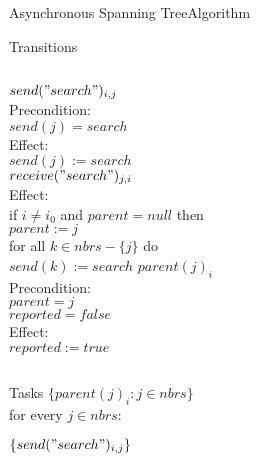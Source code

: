 \documentclass[pdf]{beamer}
\begin{document}
\begin{frame}{Asynchronous Spanning Tree}{Algorithm}
    \begin{block}{Transitions}
        \begin{columns}[t]
            $send("search")_{i,j}$ \\
            \hspace*{2pt} {Precondition:} \\
            \hspace*{5pt} {$send(j) = search$} \\
            \hspace*{2pt} {Effect:} \\
            \hspace*{5pt} {$send(j) := search$} \\
            \vspace{12pt}
            $receive("search")_{j,i}$ \\
            \hspace*{2pt} {Effect:} \\
            \hspace*{5pt} {if $i \neq i_0$ and $parent = null$ then}\\
            \hspace*{7pt} {$parent := j$} \\
            \hspace*{7pt} {for all $k \in nbrs - \{j\}$ do} \\
            \hspace*{9pt} {$send(k) := search$} 
            $parent(j)_{i}$ \\
            \hspace*{2pt} {Precondition:} \\
            \hspace*{5pt} {$parent = j$} \\
            \hspace*{5pt} {$reported = false$} \\
            \hspace*{2pt} {Effect:} \\
            \hspace*{5pt} {$reported := true$} 
        \end{columns}
    \end{block}
    \vskip-3cm
    \begin{columns}
    \begin{block}{Tasks}
    $\{parent(j)_i : j \in nbrs\}$\\
    for every $j \in nbrs$: \\
        \hspace*{2pt}
        \parbox{\textwidth}{$\{send("search")_{i,j}\}$}
    \end{block}
    \end{columns}
\end{frame}
\end{document}
